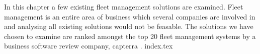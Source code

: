 In this chapter a few existing fleet management solutions are examined.
Fleet management is an entire area of business which several companies are involved in and analysing all existing solutions would not be feasable.
The solutions we have chosen to examine are ranked amongst the top 20 fleet management systems by a business software review company, capterra \cite{top20fleetmanagement}.
{index.tex}
